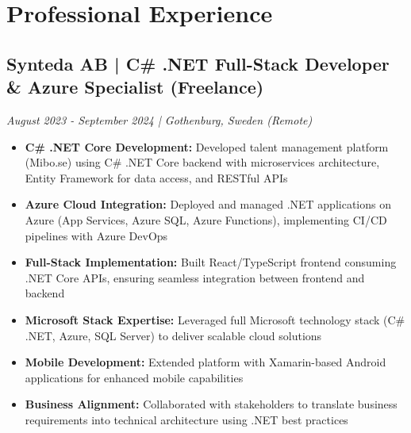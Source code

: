 \documentclass[11pt,a4paper]{article}
\begin{document}
\section*{Professional Experience}

\subsection*{Synteda AB | C\# .NET Full-Stack Developer \& Azure Specialist (Freelance)}
\textit{August 2023 - September 2024 | Gothenburg, Sweden (Remote)}
\begin{itemize}[noitemsep]
\item \textbf{C\# .NET Core Development:} Developed talent management platform (Mibo.se) using C\# .NET Core backend with microservices architecture, Entity Framework for data access, and RESTful APIs
\item \textbf{Azure Cloud Integration:} Deployed and managed .NET applications on Azure (App Services, Azure SQL, Azure Functions), implementing CI/CD pipelines with Azure DevOps
\item \textbf{Full-Stack Implementation:} Built React/TypeScript frontend consuming .NET Core APIs, ensuring seamless integration between frontend and backend
\item \textbf{Microsoft Stack Expertise:} Leveraged full Microsoft technology stack (C\# .NET, Azure, SQL Server) to deliver scalable cloud solutions
\item \textbf{Mobile Development:} Extended platform with Xamarin-based Android applications for enhanced mobile capabilities
\item \textbf{Business Alignment:} Collaborated with stakeholders to translate business requirements into technical architecture using .NET best practices
\end{itemize}
\end{document}
